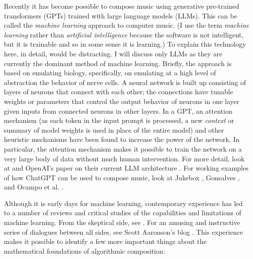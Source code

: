 \documentclass[11pt]{amsart}
\begin{document}
Recently it has become possible to compose music using generative pre-trained transformers (GPTs) trained with large language models (LLMs). This can be called the \emph{machine learning} approach to computer music. (I use the term \emph{machine learning} rather than \emph{artificial intelligence} because the software is not intelligent, but it is trainable and so in some sense it is learning.) To explain this technology here, in detail, would be distracting. I will discuss only LLMs as they are currently the dominant method of machine learning. Briefly, the approach is based on emulating biology, specifically, on emulating at a high level of abstraction the behavior of nerve cells. A neural network is built up consisting of layers of neurons that connect with each other; the connections have tunable weights or parameters that control the output behavior of neurons in one layer given inputs from connected neurons in other layers. In a GPT, an attention mechanism (as each token in the input prompt is processed, a new \emph{context} or summary of model weights is used in place of the entire model) and other heuristic mechanisms have been found to increase the power of the network. In particular, the attention mechanism makes it possible to train the network on a very large body of data without much human intervention. For more detail, look at \cite{zhang2023complete} and OpenAI's paper on their current LLM architecture \cite{openai2023gpt4}. For working examples of how ChatGPT can be used to compose music, look at Jukebox \cite{openai2023jukebox}, Gonsalves \cite{aitunes}, and Ocampo et al. \cite{ocampo2023using}.

Although it is early days for machine learning, contemporary experience has led to a number of reviews and critical studies of the capabilities and limitations of machine learning. From the skeptical side, see \cite{dale2021gpt}. For an amusing and instructive series of dialogues between all sides, see Scott Aaronson's blog \cite{shtetl}. This experience makes it possible to identify a few more important things about the mathematical foundations of algorithmic composition:
\end{document}
